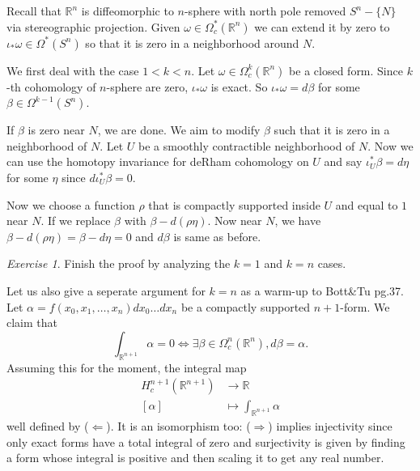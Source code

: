 \documentclass[12pt]{amsart}
\newcommand{\R}{\mathbb{R}} %
\theoremstyle{remark}
\newtheorem{exercise}{Exercise}
\begin{document}
        Recall that $\R^n$ is diffeomorphic to $n$-sphere with north pole removed $S^n-\{N\}$ via stereographic projection. Given $\omega \in \Omega_c^{*}(\R^n)$ we can extend it by zero to $\iota_* \omega \in \Omega^*(S^n)$ so that it is zero in a neighborhood around $N$. 

    We first deal with the case  $1<k<n$. Let $\omega \in \Omega_c^k(\R^n)$ be a closed form. Since  $k$-th cohomology of $n$-sphere are zero, $\iota_*\omega$ is exact. So $\iota_* \omega = d\beta$ for some $\beta \in \Omega^{k-1}(S^n)$. 

    If $\beta$ is zero near $N$, we are done. We aim to modify $\beta$ such that it is zero in a neighborhood of $N$. Let $U$ be a smoothly contractible neighborhood of $N$. Now we can use the homotopy invariance for deRham cohomology on $U$ and say 
    $\iota^*_U \beta = d \eta$ for some $\eta$ since $d\iota_U^* \beta = 0$. 

    Now we choose a function $\rho$ that is compactly supported inside $U$ and equal to $1$ near $N$. If we replace $\beta$ with $\beta - d(\rho \eta)$. Now near $N$, we have $\beta - d(\rho \eta) = \beta - d\eta = 0$ and $d\beta$ is same as before. 
    
    \begin{exercise}
Finish the proof by analyzing the $k=1$ and $k=n$ cases.
\end{exercise}
        
%
%
Let us also give a seperate argument for $k=n$ as a warm-up to Bott\&Tu pg.37. Let $\alpha=f(x_0,x_1,\dots,x_n)dx_0\dots dx_n$ be a compactly supported $n+1$-form. We claim that 
\begin{equation*}
    \int_{\R^{n+1}}\alpha = 0 \Leftrightarrow \exists \beta \in \Omega_c^n(\R^n), d\beta = \alpha.
\end{equation*}
Assuming this for the moment, the integral map
\begin{align*}
    H_c^{n+1}(\R^{n+1}) &\to \R\\
        [\alpha] &\mapsto \int_{\R^{n+1}}\alpha
\end{align*} well defined by ($\Leftarrow$). It is an isomorphism too: ($\Rightarrow$) implies injectivity since only exact forms have a total integral of zero and surjectivity is given by finding a form whose integral is positive and then scaling it to get any real number. 
\end{document}
